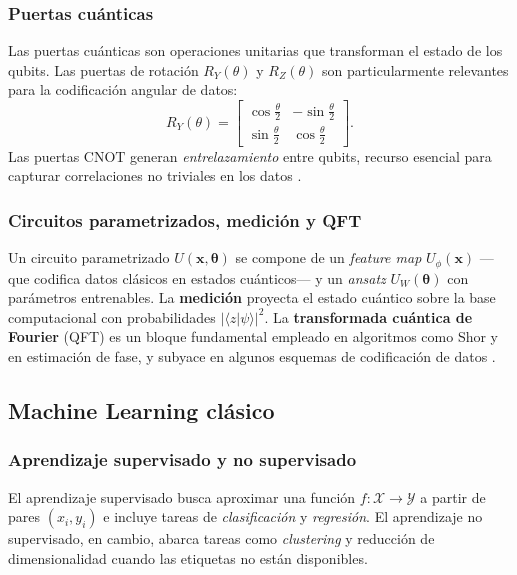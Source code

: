 \documentclass[a4paper,10pt,twocolumn]{article}
\begin{document}
\subsubsection{Puertas cu\'anticas}
Las puertas cu\'anticas son operaciones unitarias que transforman el
estado de los qubits. Las puertas de rotaci\'on $R_Y(\theta)$ y
$R_Z(\theta)$ son particularmente relevantes para la codificaci\'on
angular de datos:
\begin{equation}
R_Y(\theta) = \begin{bmatrix}
\cos\tfrac{\theta}{2} & -\sin\tfrac{\theta}{2} \\
\sin\tfrac{\theta}{2} &  \cos\tfrac{\theta}{2}
\end{bmatrix}.
\end{equation}
Las puertas $\mathrm{CNOT}$ generan \emph{entrelazamiento} entre qubits,
recurso esencial para capturar correlaciones no triviales en los datos
\citep{nielsen2010}.

\subsubsection{Circuitos parametrizados, medici\'on y QFT}
Un circuito parametrizado $U(\mathbf{x},\boldsymbol{\theta})$ se compone
de un \textit{feature map} $U_\phi(\mathbf{x})$ ---que codifica datos
cl\'asicos en estados cu\'anticos--- y un \textit{ansatz}
$U_W(\boldsymbol{\theta})$ con par\'ametros entrenables. La
\textbf{medici\'on} proyecta el estado cu\'antico sobre la base
computacional con probabilidades $|\langle z|\psi\rangle|^2$. La
\textbf{transformada cu\'antica de Fourier} (QFT) es un bloque
fundamental empleado en algoritmos como Shor y en estimaci\'on de fase,
y subyace en algunos esquemas de codificaci\'on de datos
\citep{nielsen2010}.

\subsection{Machine Learning cl\'asico}

\subsubsection{Aprendizaje supervisado y no supervisado}
El aprendizaje supervisado busca aproximar una funci\'on
$f:\mathcal{X}\to\mathcal{Y}$ a partir de pares $(x_i, y_i)$ e incluye
tareas de \emph{clasificaci\'on} y \emph{regresi\'on}. El aprendizaje
no supervisado, en cambio, abarca tareas como \textit{clustering} y
reducci\'on de dimensionalidad cuando las etiquetas no est\'an
disponibles.
\end{document}
